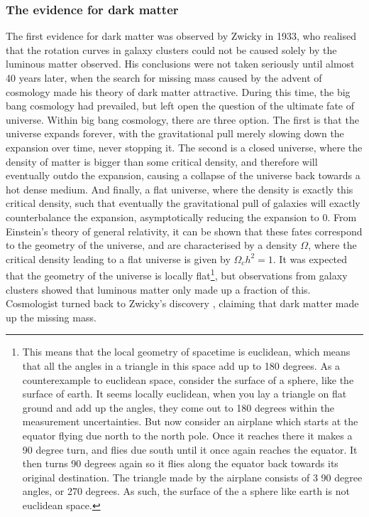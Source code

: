 \subsubsection{The evidence for dark matter}
The first evidence for dark matter was observed by Zwicky \cite{Zwicky} in 1933, who realised that the rotation curves in galaxy clusters could not be caused solely by the luminous matter observed. His conclusions were not taken seriously until almost 40 years later, when the search for missing mass caused by the advent of cosmology made his theory of dark matter attractive. During this time, the big bang cosmology had prevailed, but left open the question of the ultimate fate of universe. Within big bang cosmology, there are three option. The first is that the universe expands forever, with the gravitational pull merely slowing down the expansion over time, never stopping it. The second is a closed universe, where the density of matter is bigger than some critical density, and therefore will eventually outdo the expansion, causing a collapse of the universe back towards a hot dense medium. And finally, a flat universe, where the density is exactly this critical density, such that eventually the gravitational pull of galaxies will exactly counterbalance the expansion, asymptotically reducing the expansion to 0. From Einstein's theory of general relativity, it can be shown that these fates correspond to the geometry of the universe, and are characterised by a density $\Omega$, where the critical density leading to a flat universe is given by $\Omega_c h^2= 1$\cite{PDG2022, Planck2020}. It was expected that the geometry of the universe is locally flat\footnote{This means that the local geometry of spacetime is euclidean, which means that all the angles in a triangle in this space add up to 180 degrees. As a counterexample to euclidean space, consider the surface of a sphere, like the surface of earth. It seems locally euclidean, when you lay a triangle on flat ground and add up the angles, they come out to 180 degrees within the measurement uncertainties. But now consider an airplane which starts at the equator flying due north to the north pole. Once it reaches there it makes a 90 degree turn, and flies due south until it once again reaches the equator. It then turns 90 degrees again so it flies along the equator back towards its original destination. The triangle made by the airplane consists of 3 90 degree angles, or 270 degrees. As such, the surface of the a sphere like earth is not euclidean space.}, but observations from galaxy clusters showed that luminous matter only made up a fraction of this\cite{}.%
Cosmologist turned back to Zwicky's discovery \cite{}, claiming that dark matter made up the missing mass. \\

